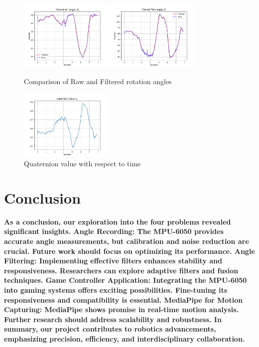 \documentclass[conference]{IEEEtran}
\begin{document}
\begin{figure}[htbp]
  \centering
  \includegraphics[width=0.4\textwidth]{figures/figure_8.png}
  \includegraphics[width=0.4\textwidth]{figures/figure_9.png}
  \caption{Comparison of Raw and Filtered rotation angles}
  \label{fig:filter}
\end{figure}

\begin{figure}[htbp]
  \centering
  \includegraphics[width=0.4\textwidth]{figures/figure_7.png}
  \caption{Quaternion value with respect to time}
  \label{fig:Q}
\end{figure}


\section{Conclusion}
\textbf{
    As a conclusion, our exploration into the four problems revealed significant insights. Angle Recording: The MPU-6050 provides accurate angle measurements, but calibration and noise reduction are crucial. Future work should focus on optimizing its performance.
    Angle Filtering: Implementing effective filters enhances stability and responsiveness. Researchers can explore adaptive filters and fusion techniques.
    Game Controller Application: Integrating the MPU-6050 into gaming systems offers exciting possibilities. Fine-tuning its responsiveness and compatibility is essential.
    MediaPipe for Motion Capturing: MediaPipe shows promise in real-time motion analysis. Further research should address scalability and robustness.
    In summary, our project contributes to robotics advancements, emphasizing precision, efficiency, and interdisciplinary collaboration.
}
\end{document}
